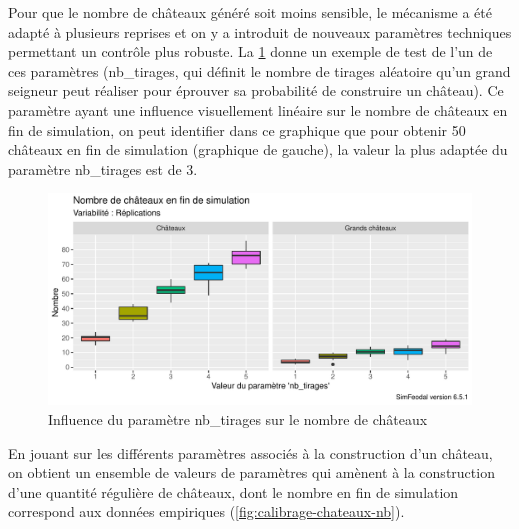 Pour que le nombre de châteaux généré soit moins sensible, le mécanisme a été adapté à plusieurs reprises et on y a introduit de nouveaux paramètres techniques permettant un contrôle plus robuste.
La \cref{fig:calibrage-param-chateaux} donne un exemple de test de l'un de ces paramètres (\textsf{nb\_tirages}, qui définit le nombre de tirages aléatoire qu'un grand seigneur peut réaliser pour éprouver sa probabilité de construire un château).
Ce paramètre ayant une influence visuellement linéaire sur le nombre de châteaux en fin de simulation, on peut identifier dans ce graphique que pour obtenir 50 châteaux en fin de simulation (graphique de gauche), la valeur la plus adaptée du paramètre \textsf{nb\_tirages} est de 3.

\begin{figure}[H]
	\centering
	\includegraphics[width=\linewidth]{img/calibrage_nombre_chateaux.pdf}
	\caption[Influence du paramètre \textsf{nb\_tirages} sur le nombre de châteaux.]{Influence du paramètre \textsf{nb\_tirages} sur le nombre de châteaux%
	}
	\label{fig:calibrage-param-chateaux}
\end{figure}

En jouant sur les différents paramètres associés à la construction d'un château, on obtient un ensemble de valeurs de paramètres qui amènent à la construction d'une quantité régulière de châteaux, dont le nombre en fin de simulation correspond aux données empiriques (\cref{fig:calibrage-chateaux-nb}).

